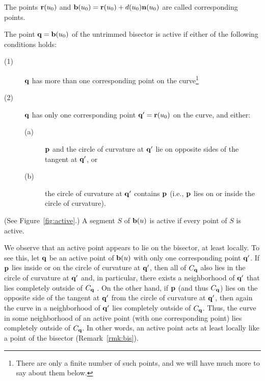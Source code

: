 
\begin{dfn}
The points ${\bf r}(u_0)$ and ${\bf b}(u_0) = {\bf r}(u_0) +
d(u_0){\bf n}(u_0)$ are called
{\rm corresponding} points.
\end{dfn}

\begin{dfn}
The point ${\bf q} = {\bf b}(u_{0})$ of the untrimmed bisector is
{\rm active} if either of the following conditions holds:
\begin{description}
\item[(1)]
        ${\bf q}$ has more than one corresponding point on the
        curve\footnote{There are only a finite number of such points,
        and we will have much more to say about them below.}
\item[(2)]
        ${\bf q}$ has only one corresponding point ${\bf q}' =
        {\bf r}(u_0)$ on the curve, and either:
\begin{description}
\item[(a)]
        ${\bf p}$ and the circle of curvature at ${\bf q}'$
        lie on opposite sides of the tangent at ${\bf q'}$, or
\item[(b)]
        the circle of curvature at ${\bf q}'$ contains ${\bf p}$
        (i.e., ${\bf p}$ lies on or inside the circle of curvature).
\end{description}
\end{description}
(See Figure~\ref{fig:active}.)
A segment $S$ of ${\bf b}(u)$ is active if every point of $S$ is active.
\end{dfn}


\begin{rmk}
\label{r:active}
{\rm
We observe that an active point appears to lie on the bisector, at least
locally. To see this,
let ${\bf q}$ be an active point of ${\bf b}(u)$ with only one corresponding
point ${\bf q}'$.
If ${\bf p}$ lies inside or on the circle of curvature at ${\bf q}'$,
then all of $C_{\bf q}$ also lies in the circle of curvature at ${\bf q}'$
and, in particular, there exists a neighborhood of ${\bf q}'$
that lies completely outside of $C_{\bf q}$ \cite[p.~176]{H52}.
On the other hand, if ${\bf p}$ (and thus $C_{\bf q}$) lies on the opposite side
of the tangent at ${\bf q}'$ from the circle of curvature at ${\bf q}'$,
then again the curve in a neighborhood of ${\bf q}'$ lies completely outside of
$C_{\bf q}$.
Thus, the curve in some neighborhood of an active point (with one corresponding
point) lies completely outside of $C_{\bf q}$.
In other words, an active point acts at least locally
like a point of the bisector (Remark~\ref{rmk:bis}).
}
\end{rmk}

